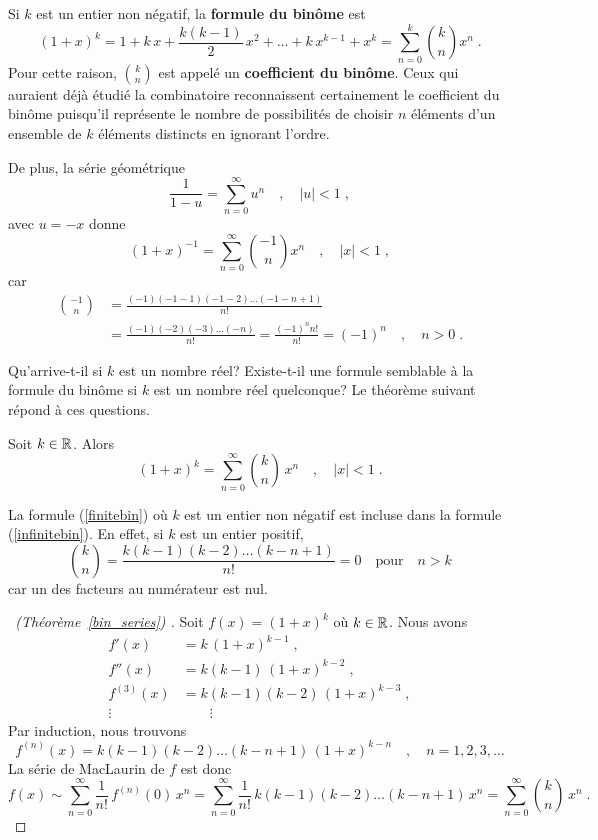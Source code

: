 {Si $k$ est un entier non négatif, la {\bfseries formule du binôme}
 est
\begin{equation}\label{finitebin}
(1+x)^k = 1 + k\,x + \frac{k(k-1)}{2}\,x^2 + \ldots + k\,x^{k-1} + x^k
= \sum_{n=0}^k \binom{k}{n} x^n \; .
\end{equation}
Pour cette raison, $\displaystyle \binom{k}{n}$ est appelé un
{\bfseries coefficient du binôme}.
Ceux qui auraient déjà étudié la combinatoire reconnaissent
certainement le coefficient du binôme puisqu'il représente le nombre
de possibilités de choisir $n$ éléments d'un ensemble de 
$k$ éléments distincts en ignorant l'ordre.

De plus, la série géométrique
\[
\frac{1}{1-u} = \sum_{n=0}^\infty u^n \quad , \quad |u|<1 \; ,
\]
avec $u=-x$ donne
\[
(1+x)^{-1} = \sum_{n=0}^\infty \binom{-1}{n} x^n \quad , \quad |x|<1\; ,
\]
car
\begin{align*}
\binom{-1}{n} &= \frac{(-1)(-1-1)(-1-2)\ldots(-1-n+1)}{n!} \\
&= \frac{(-1)(-2)(-3)\ldots(-n)}{n!} = \frac{(-1)^n n!}{n!} = (-1)^n
\quad , \quad n>0 \;.
\end{align*}

Qu'arrive-t-il si $k$ est un nombre réel?  Existe-t-il une formule semblable
à la formule du binôme si $k$ est un nombre réel quelconque?  Le théorème
suivant répond à ces questions.

\begin{theorem} \label{bin_series}
Soit $k\in \mathbb{R}$.  Alors
\begin{equation}\label{infinitebin}
(1+x)^k = \sum_{n=0}^\infty \binom{k}{n} \, x^n \quad , \quad |x|<1 \; .
\end{equation}
\end{theorem}

\begin{rmk}
La formule (\ref{finitebin}) où $k$ est un entier non négatif est
incluse dans la formule (\ref{infinitebin}).  En effet, si $k$ est un
entier positif,
\[
\binom{k}{n} = \frac{k(k-1)(k-2)\ldots(k-n+1)}{n!} = 0
\quad \text{pour} \quad n > k
\]
car un des facteurs au numérateur est nul.
\end{rmk}

\begin{proof}[\UOproof\ (Théorème~\ref{bin_series}) \theory]
Soit $f(x)=(1+x)^k$ où $k\in \mathbb{R}$.  Nous avons
\begin{align*}
f'(x) &= k\,(1+x)^{k-1} \; ,\\
f''(x) &= k(k-1)\,(1+x)^{k-2} \; , \\
f^{(3)}(x) &= k(k-1)(k-2)\,(1+x)^{k-3} \; , \\
\vdots & \qquad \vdots
\end{align*}
Par induction, nous trouvons
\[
f^{(n)}(x) = k(k-1)(k-2)\ldots(k-n+1)\,(1+x)^{k-n} \quad , \quad
n=1,2,3,\ldots
\]
La série de MacLaurin de $f$ est donc
\[
f(x) \sim \sum_{n=0}^\infty \frac{1}{n!}\,f^{(n)}(0)\, x^n
= \sum_{n=0}^\infty \frac{1}{n!}\,k(k-1)(k-2)\ldots(k-n+1)\, x^n
= \sum_{n=0}^\infty \binom{k}{n} \, x^n \; .
\]


\end{proof}}
